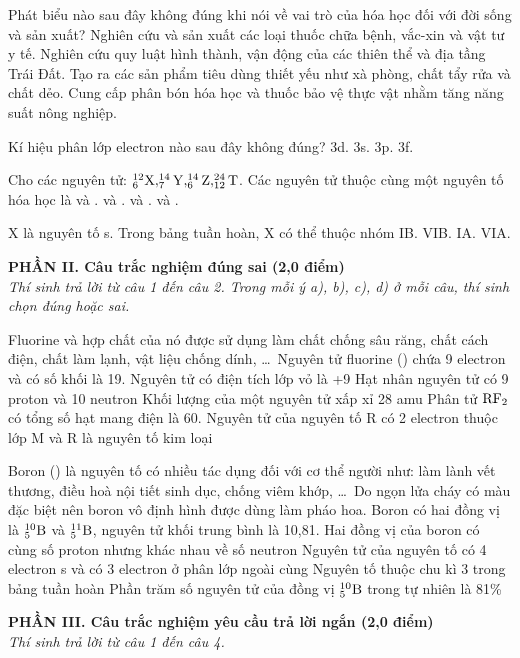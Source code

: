\documentclass[11pt,a4paper]{article}
\begin{document}
\begin{ex}
Phát biểu nào sau đây không đúng khi nói về vai trò của hóa học đối với đời sống và sản xuất?
\choice
{Nghiên cứu và sản xuất các loại thuốc chữa bệnh, vắc-xin và vật tư y tế.}
{Nghiên cứu quy luật hình thành, vận động của các thiên thể và địa tầng Trái Đất.}
{Tạo ra các sản phẩm tiêu dùng thiết yếu như xà phòng, chất tẩy rửa và chất dẻo.}
{Cung cấp phân bón hóa học và thuốc bảo vệ thực vật nhằm tăng năng suất nông nghiệp.}
\end{ex}
\begin{ex}
Kí hiệu phân lớp electron nào sau đây không đúng?
\choice
{3d.}
{3s.}
{3p.}
{3f.}
\end{ex}
\begin{ex}
Cho các nguyên tử: $^{12}_6\ce{X}, ^{14}_7\ce{Y}, ^{14}_6\ce{Z}, ^{24}_{12}\ce{T}$. Các nguyên tử thuộc cùng một nguyên tố hóa học là
\choice
{ và .}
{ và .}
{ và .}
{ và .}
\end{ex}
\begin{ex}
X là nguyên tố s. Trong bảng tuần hoàn, X có thể thuộc nhóm
\choice
{IB.}
{VIB.}
{IA.}
{VIA.}
\end{ex}
\vspace{4pt}
\noindent
{\color{mainGreen}\textbf{\large PHẦN II. Câu trắc nghiệm đúng sai (2,0 điểm)}}\\
\textit{\small Thí sinh trả lời từ câu 1 đến câu 2. Trong mỗi ý a), b), c), d) ở mỗi câu, thí sinh chọn đúng hoặc sai.}
\vspace{2pt}

\begin{ex}
Fluorine và hợp chất của nó được sử dụng làm chất chống sâu răng, chất cách điện, chất làm lạnh, vật liệu chống dính, \dots\ Nguyên tử fluorine () chứa 9 electron và có số khối là 19.
\choiceTF
{Nguyên tử  có điện tích lớp vỏ là +9}
{Hạt nhân nguyên tử  có 9 proton và 10 neutron}
{Khối lượng của một nguyên tử  xấp xỉ 28 amu}
{Phân tử $\ce{RF2}$ có tổng số hạt mang điện là 60. Nguyên tử của nguyên tố R có 2 electron thuộc lớp M và R là nguyên tố kim loại}
\end{ex}
\begin{ex}
Boron () là nguyên tố có nhiều tác dụng đối với cơ thể người như: làm lành vết thương, điều hoà nội tiết sinh dục, chống viêm khớp, \dots\ Do ngọn lửa cháy có màu đặc biệt nên boron vô định hình được dùng làm pháo hoa. Boron có hai đồng vị là $^{10}_5\ce{B}$ và $^{11}_5\ce{B}$, nguyên tử khối trung bình là 10,81.
\choiceTF
{Hai đồng vị của boron có cùng số proton nhưng khác nhau về số neutron}
{Nguyên tử của nguyên tố  có 4 electron s và có 3 electron ở phân lớp ngoài cùng}
{Nguyên tố  thuộc chu kì 3 trong bảng tuần hoàn}
{Phần trăm số nguyên tử của đồng vị $^{10}_5\ce{B}$ trong tự nhiên là 81\%}
\end{ex}
\vspace{4pt}
\noindent
{\color{mainGreen}\textbf{\large PHẦN III. Câu trắc nghiệm yêu cầu trả lời ngắn (2,0 điểm)}}\\
\textit{\small Thí sinh trả lời từ câu 1 đến câu 4.}
\vspace{2pt}
\end{document}
